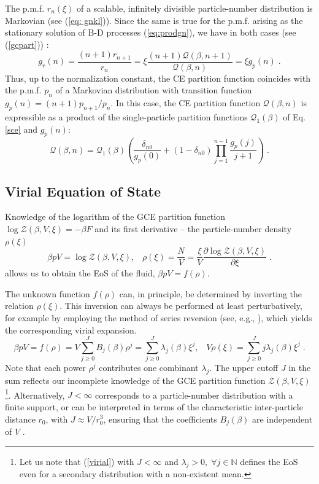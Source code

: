 \documentclass[a4paper,12pt]{amsart}
\newcommand{\N}{\mathbb{N}}
\theoremstyle{definition}
\theoremstyle{remark}
\begin{document}
The p.m.f. $r_n(\xi)$ of a scalable, infinitely divisible particle-number distribution is Markovian (see  (\ref{eq: gnkl})). Since the same is true for the p.m.f. arising as the stationary solution of B-D processes (\ref{eq:prodgn}), we have in both cases (see (\ref{gcpart})) :
\[
g_r(n)=\frac{(n+1) r_{n+1}}{r_n}=\xi\frac{(n+1)\mathcal{Q}(\beta,n+1)}{\mathcal{Q}(\beta,n)}=\xi g_p(n)\;.
\]
Thus, up to the normalization constant, the CE partition function coincides with the p.m.f. $p_n$ of a Markovian distribution with transition function $g_p(n)=(n+1)p_{n+1}/p_n$. In this case, the CE partition function $\mathcal{Q}(\beta, n)$ is expressible as a product of the single-particle partition functions  $\mathcal{Q}_1(\beta)$ of Eq. \ref{sce} and $g_p(n)$:
\begin{equation}\label{gcpartgn}
\mathcal{Q}(\beta, n) = \mathcal{Q}_1(\beta)\left(\frac{\delta_{n0}}{g_p(0)}+(1-\delta_{n0})\prod_{j=1}^{n-1}\frac{g_p(j)}{j+1}\right)\;.
\end{equation}
\subsection{Virial Equation of State} \label{EOS}
Knowledge of the logarithm of the GCE partition function $\log \mathcal{Z}(\beta, V,\xi)=-\beta F$  and its first derivative -- the particle-number density $\rho(\xi)$
\begin{equation} \label{virexp}
    \beta  pV =\log \mathcal{Z}(\beta, V,\xi),\;\;\;\rho(\xi)=\frac{N}{V}
    =\frac{\xi}{V}\frac{\partial\log \mathcal{Z}(\beta, V,\xi)}{\partial\xi}\;.
\end{equation}
allows us to obtain the EoS of the fluid, $\beta p V=f(\rho)$.

The unknown function \(f(\rho)\) can, in principle, be determined by inverting the relation \(\rho(\xi)\). This inversion can always be performed at least perturbatively, for example by employing the method of series reversion (see, e.g., \cite{AbSteg1972}), which yields the corresponding virial expansion.\begin{equation}\label{virial}
\beta p V = f(\rho)= V\sum_{j\geq 0}^J B_{j}(\beta) \rho^{j}= \sum_{j\geq 0}^{J}\lambda_j(\beta)\xi^j,\;\;\;V\rho(\xi)=\sum_{j\geq 0}^{J}j\lambda_j(\beta)\xi^j \;.
\end{equation}
Note that each power $\rho^j$ contributes one combinant $\lambda_j$. The upper cutoff $J$ in the sum reflects our incomplete knowledge of the GCE partition function $\mathcal{Z}(\beta, V, \xi)$\footnote{Let us note that  (\ref{virial}) with $J<\infty$ and $\lambda_j>0,\;\forall j\in \N$ defines the EoS even for a secondary distribution with a non-existent mean.}. 
Alternatively, $J<\infty$ corresponds to a particle-number distribution with a finite support, or can be interpreted in terms of the characteristic inter-particle distance $r_0$, with $J\approx V/r^3_0$, ensuring that the coefficients $B_j( \beta)$ are independent of $V$ \cite{Hill}.  
\end{document}

